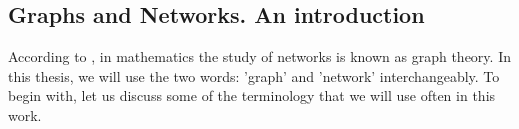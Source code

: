 \documentclass[10pt,a4paper]{article}
\theoremstyle{plain}
\theoremstyle{definition}
\begin{document}
\subsection{Graphs and Networks. An introduction}

According to \citep{estrada2011structure}, in mathematics the study of networks is known as graph theory. In this thesis, we will use the two words: 'graph' and 'network' interchangeably.  To begin with, let us discuss some of the terminology that we will use often in this work.


\end{document}
